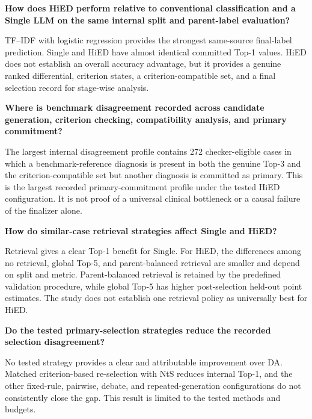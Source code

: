 \begin{description}[style=nextline,leftmargin=1.5cm,labelwidth=1.1cm,itemsep=0.2em,parsep=0pt]

\item[RQ1] \textbf{How does HiED perform relative to conventional classification and a Single LLM on the same internal split and parent-label evaluation?}

TF--IDF with logistic regression provides the strongest same-source final-label prediction. Single and HiED have almost identical committed Top-1 values. HiED does not establish an overall accuracy advantage, but it provides a genuine ranked differential, criterion states, a criterion-compatible set, and a final selection record for stage-wise analysis.

\item[RQ2] \textbf{Where is benchmark disagreement recorded across candidate generation, criterion checking, compatibility analysis, and primary commitment?}

The largest internal disagreement profile contains 272 checker-eligible cases in which a benchmark-reference diagnosis is present in both the genuine Top-3 and the criterion-compatible set but another diagnosis is committed as primary. This is the largest recorded primary-commitment profile under the tested HiED configuration. It is not proof of a universal clinical bottleneck or a causal failure of the finalizer alone.

\item[RQ3] \textbf{How do similar-case retrieval strategies affect Single and HiED?}

Retrieval gives a clear Top-1 benefit for Single. For HiED, the differences among no retrieval, global Top-5, and parent-balanced retrieval are smaller and depend on split and metric. Parent-balanced retrieval is retained by the predefined validation procedure, while global Top-5 has higher post-selection held-out point estimates. The study does not establish one retrieval policy as universally best for HiED.

\item[RQ4] \textbf{Do the tested primary-selection strategies reduce the recorded selection disagreement?}

No tested strategy provides a clear and attributable improvement over DA. Matched criterion-based re-selection with NtS reduces internal Top-1, and the other fixed-rule, pairwise, debate, and repeated-generation configurations do not consistently close the gap. This result is limited to the tested methods and budgets.


\end{description}
